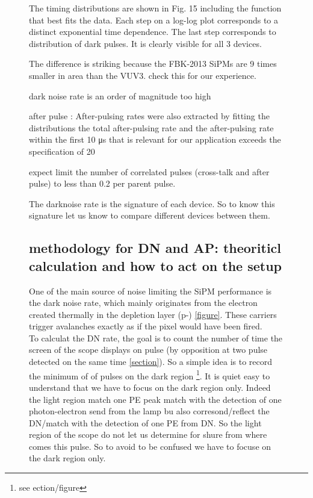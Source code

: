 \documentclass[a4paper, 11pt]{report}%
\begin{document}
\begin{figure}[!hbtp]
  The timing distributions are shown in Fig. 15 including the function that best fits the data. Each step on a log-log plot
  corresponds to a distinct exponential time dependence. The last step corresponds to distribution of dark pulses. It is clearly
  visible for all 3 devices. 
  
  The difference is striking because the FBK-2013 SiPMs are 9 times smaller in area than the VUV3. check this for our experience. 
  
  dark noise rate is an order of magnitude too high
  
  after pulse : After-pulsing rates were also extracted by fitting the distributions
  the total after-pulsing rate and the after-pulsing rate within the first 10 μs that is relevant for our application
  exceeds the specification of 20%
  
  expect limit the number of correlated pulses (cross-talk and after pulse) to less than 0.2 per parent pulse.
  
  
  
  
  
  The darknoise rate is the signature of each device. So to know this signature let us know to compare different devices between them. 
   
  \subsection{methodology for DN and AP: theoriticl calculation and how to act on the setup}
  
  One of the main source of noise limiting the SiPM performance is the dark noise rate, which mainly originates from the electron 
  created thermally in the depletion layer (p-) \ref{figure}. These carriers trigger avalanches exactly as if the pixel would have been fired.
  \\
  To calculat the DN rate, the goal is to count the number of time the screen of the scope
  displays on pulse (by opposition at two pulse detected on the same time \ref{section}). So a simple idea is 
  to record the minimum of of pulses on the dark region \footnote{see ection/figure}. It is quiet easy to understand
  that we have to focus on the dark region only. Indeed the light region match one PE peak match with the detection of one photon-electron send from
  the lamp bu also corresond/reflect the DN/match with the detection of one PE from DN. So the light region of the scope do not let us determine for shure from where comes 
  this pulse. So to avoid to be confused we have to focuse on the dark region only. 
  \\
  

\end{figure}
\end{document}
